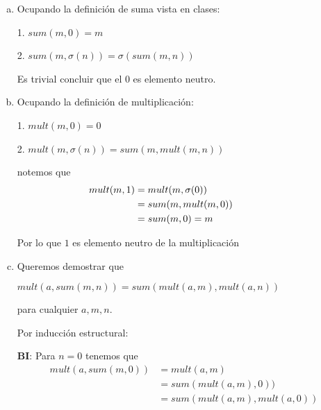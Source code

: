 
\newcommand\myeq{\stackrel{\mathclap{\scriptsize\mbox{HI}}}{\equiv}}

\begin{enumerate}[a)]
    
    \item Ocupando la definición de suma vista en clases:
    
    \hspace{10mm} 1. $sum(m, 0) = m$
    
    \hspace{10mm} 2. $sum(m, \sigma(n)) =\sigma(sum(m, n))$
    
    Es trivial concluir que el 0 es elemento neutro.
    
    \vspace{5mm}
    
    \item Ocupando la definición de multiplicación:
    
    \hspace{10mm} 1. $mult(m, 0) = 0$
    
    \hspace{10mm} 2. $mult(m, \sigma(n)) =sum(m, mult(m, n))$
    
    notemos que 
    \begin{align*}
        \hspace{-20mm} mult(m, 1) &= mult(m, \sigma(0)) \\
                   &= sum(m, mult(m, 0)) \\
                   &= sum(m, 0) = m
    \end{align*}
    
    Por lo que $1$ es elemento neutro de la multiplicación
    
    
    \item Queremos demostrar que 

    \hspace{20mm} $mult(a, sum(m, n)) = sum(mult(a, m), mult(a, n))$
    
    para cualquier $a, m, n$.
    
    Por inducción estructural:
    
    \textbf{BI}: Para $n = 0$ tenemos que
    \begin{align*}
        mult(a, sum(m, 0)) &= mult(a, m) \\
                           &= sum(mult(a, m), 0))\\
                           &= sum(mult(a, m), mult(a, 0))
    \end{align*}
    

\end{enumerate}
